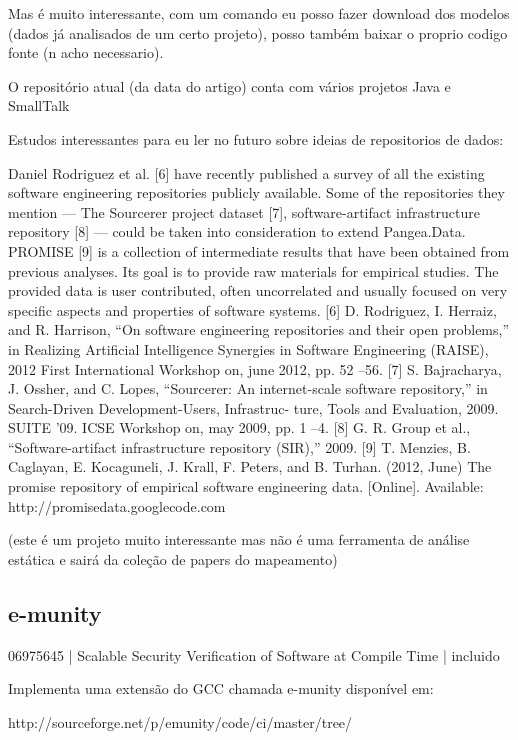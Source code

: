 Mas é muito interessante, com um comando eu posso fazer download dos modelos
(dados já analisados de um certo projeto), posso também baixar o proprio
codigo fonte (n acho necessario).

O repositório atual (da data do artigo) conta com vários projetos Java e
SmallTalk

Estudos interessantes para eu ler no futuro sobre ideias de repositorios de
dados:

Daniel Rodriguez et al. [6] have recently published a survey
of all the existing software engineering repositories publicly
available. Some of the repositories they mention — The
Sourcerer project dataset [7], software-artifact infrastructure
repository [8] — could be taken into consideration to extend
Pangea.Data.
PROMISE [9] is a collection of intermediate results that
have been obtained from previous analyses. Its goal is to
provide raw materials for empirical studies. The provided data
is user contributed, often uncorrelated and usually focused on
very specific aspects and properties of software systems.
[6] D. Rodriguez, I. Herraiz, and R. Harrison, “On software engineering
repositories and their open problems,” in Realizing Artificial Intelligence
Synergies in Software Engineering (RAISE), 2012 First International
Workshop on, june 2012, pp. 52 –56.
[7] S. Bajracharya, J. Ossher, and C. Lopes, “Sourcerer: An internet-scale
software repository,” in Search-Driven Development-Users, Infrastruc-
ture, Tools and Evaluation, 2009. SUITE ’09. ICSE Workshop on, may
2009, pp. 1 –4.
[8] G. R. Group et al., “Software-artifact infrastructure repository (SIR),”
2009.
[9] T. Menzies, B. Caglayan, E. Kocaguneli, J. Krall, F. Peters, and
B. Turhan. (2012, June) The promise repository of empirical software
engineering data. [Online]. Available: http://promisedata.googlecode.com

(este é um projeto muito interessante mas não é uma ferramenta de análise
estática e sairá da coleção de papers do mapeamento)

\subsection{e-munity}

06975645 | Scalable Security Verification of Software at Compile Time | incluido

Implementa uma extensão do GCC chamada e-munity disponível em:

http://sourceforge.net/p/emunity/code/ci/master/tree/

